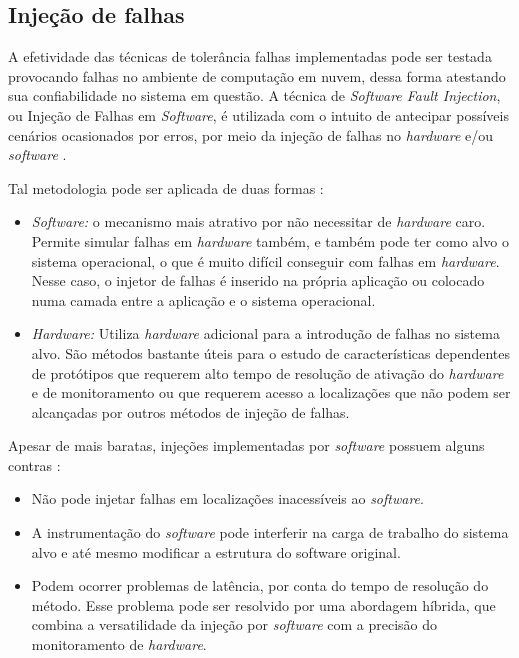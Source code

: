 \documentclass[
	12pt,				%
	oneside,			%
	a4paper,			%
	chapter=TITLE,		%
	english,			%
	french,				%
	spanish,			%
	brazil				%
	]{abntex2}
\begin{document}
\subsection{Injeção de falhas}

A efetividade das técnicas de tolerância falhas implementadas pode ser testada provocando falhas no ambiente de computação em nuvem, dessa forma atestando sua confiabilidade no sistema em questão. A técnica de \emph{Software Fault Injection}, ou Injeção de Falhas em \emph{Software}, é utilizada com o intuito de antecipar possíveis cenários ocasionados por erros, por meio da injeção de falhas no \emph{hardware} e/ou \emph{software} \cite{natella2016assessing}.

Tal metodologia pode ser aplicada de duas formas \cite{hsueh1997fault}:

\begin{itemize}
    \item \emph{Software:} o mecanismo mais atrativo por não necessitar de \emph{hardware} caro. Permite simular falhas em \emph{hardware} também, e também pode ter como alvo o sistema operacional, o que é muito difícil conseguir com falhas em \emph{hardware}. Nesse caso, o injetor de falhas é inserido na própria aplicação ou colocado numa camada entre a aplicação e o sistema operacional.
    \item \emph{Hardware:} Utiliza \emph{hardware} adicional para a introdução de falhas no sistema alvo. São métodos bastante úteis para o estudo de características dependentes de protótipos que requerem alto tempo de resolução de ativação do \emph{hardware} e de monitoramento ou que requerem acesso a localizações que não podem ser alcançadas por outros métodos de injeção de falhas.
\end{itemize}

Apesar de mais baratas, injeções implementadas por \emph{software} possuem alguns contras \cite{hsueh1997fault}:

\begin{itemize}
    \item Não pode injetar falhas em localizações inacessíveis ao \emph{software}.
    \item A instrumentação do \emph{software} pode interferir na carga de trabalho do sistema alvo e até mesmo modificar a estrutura do software original.
    \item Podem ocorrer problemas de latência, por conta do tempo de resolução do método. Esse problema pode ser resolvido por uma abordagem híbrida, que combina a versatilidade da injeção por \emph{software} com a precisão do monitoramento de \emph{hardware}.
\end{itemize}
\end{document}

